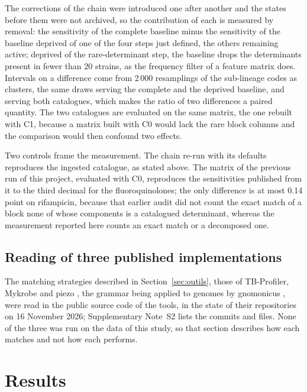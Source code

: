 \documentclass[11pt]{article}
\begin{document}
The corrections of the chain were introduced one after another and the states before them
were not archived, so the contribution of each is measured by removal: the sensitivity of
the complete baseline minus the sensitivity of the baseline deprived of one of the four steps
just defined, the others remaining active; deprived of the rare-determinant step, the baseline
drops the determinants present in fewer than 20 strains, as the frequency filter of a feature
matrix does. Intervals on a difference come from 2\,000 resamplings of the sub-lineage codes
as clusters, the same draws serving the complete and the deprived baseline, and serving both
catalogues, which makes the ratio of two differences a paired quantity. The two catalogues are evaluated on the same matrix, the one
rebuilt with C1, because a matrix built with C0 would lack the rare block columns and the
comparison would then confound two effects.

Two controls frame the measurement. The chain re-run with its defaults reproduces the
ingested catalogue, as stated above. The matrix of the previous run of this project,
evaluated with C0, reproduces the sensitivities published from it to the third decimal for
the fluoroquinolones; the only difference is at most 0.14 point on rifampicin, because
that earlier audit did not count the exact match of a block none of whose components is a
catalogued determinant, whereas the measurement reported here counts an exact match or a
decomposed one.

\subsection{Reading of three published implementations}
The matching strategies described in Section~\ref{sec:outils}, those of TB-Profiler,
Mykrobe \cite{hunt2019} and piezo \cite{piezo}, the grammar being applied to genomes by
gnomonicus \cite{gnomonicus}, were read in the public source code of the tools, in the
state of their repositories on 16 November 2026; Supplementary Note~S2 lists the commits
and files. None of the three was run on the data of this study, so that section describes
how each matches and not how each performs.

\section{Results}
\end{document}
